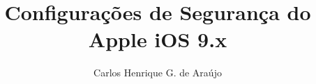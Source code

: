 \documentclass[12pt,oneside]{book}
\begin{document}
\frontmatter

\title{Configura\c c\~oes de Seguran\c ca do Apple iOS 9.x}
\author{Carlos Henrique G. de Ara\'ujo}

\maketitle

\tableofcontents

\mainmatter






\end{document}
